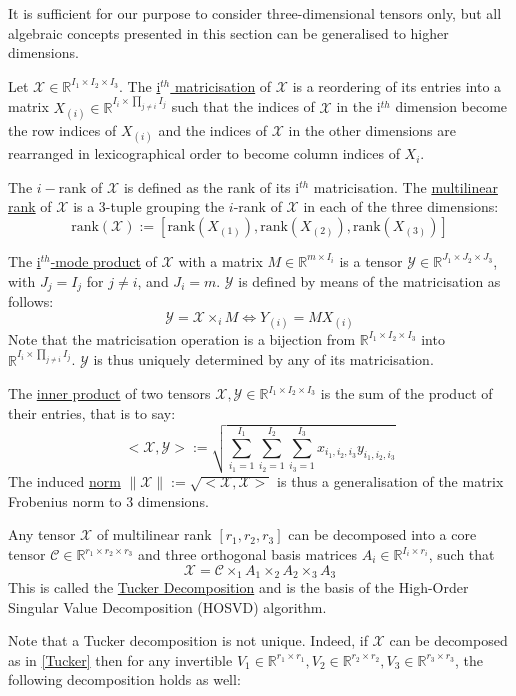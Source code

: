 \documentclass[a4paper, 11pt]{article} %
\def \be {\begin{equation*}}
\def \ee {\end{equation*}}
\def \bee {\begin{equation}}
\def \eee {\end{equation}}
\def \X {\mathcal{X}}
\def \R {\mathbb{R}}
\def \t {\times}
\def \rank{\mbox{rank}}
\def \Y {\mathcal{Y}}
\def \C {\mathcal{C}}
\begin{document}
It is sufficient for our purpose to consider three-dimensional tensors only, but all algebraic concepts presented in this section can be generalised to higher dimensions.

Let $\X \in \R^{I_1\t I_2 \t I_3}$.
The \underline{i$^{th}$ matricisation} of $\X$ is a reordering of its entries into a matrix $X_{(i)} \in \R^{ I_i\t \prod_{j\neq i}I_j}$ such that the indices of $\X$ in the i$^{th}$ dimension become the row indices of $X_{(i)}$ and the indices of $\X$ in the other dimensions are rearranged in lexicographical order to become column indices of $X_{i}$. 

The $i-$rank of $\X$ is defined as the rank of its i$^{th}$ matricisation. The \underline{multilinear rank} of $\X$ is a 3-tuple grouping the $i$-rank of $\X$ in each of the three dimensions:
\be
\rank(\X):=\left[\rank(X_{(1)}),  \rank(X_{(2)}), \rank(X_{(3)})\right]
\ee

The \underline{i$^{th}$-mode product} of $\X$ with a matrix $M \in \R^{m\t I_i}$ is a tensor $\mathcal{Y} \in \R^{J_1\t J_2\t J_3}$, with $J_j=I_j$ for $j\neq i$, and $J_i=m$. $\mathcal{Y}$ is defined by means of the matricisation as follows:
\be
\mathcal{Y}=\X \t_{i} M \iff Y_{(i)}=MX_{(i)}
\ee
Note that the matricisation operation is a bijection from $ \R^{I_1\t I_2 \t I_3}$ into $\R^{ I_i\t \prod_{j\neq i}I_j}$. $\mathcal{Y}$ is thus uniquely determined by any of its matricisation.

The \underline{inner product} of two tensors $\X, \Y \in \R^{I_1\t I_2 \t I_3}$ is the sum of the product of their entries, that is to say:
\bee
<\X,\Y>:=\sqrt{\sum\limits_{i_1=1}^{I_1}\sum\limits_{i_2=1}^{I_2}\sum\limits_{i_3=1}^{I_3} x_{i_1,i_2,i_3}y_{i_1,i_2,i_3}}
\label{innerProd}
\eee
The induced \underline{norm} $\|\X\|:=\sqrt{<\X, \X>}$ is thus a generalisation of the matrix Frobenius norm to 3 dimensions.

Any tensor $\X$ of multilinear rank $[r_1, r_2, r_3]$ can be decomposed into a core tensor $\C \in \R^{r_1\t r_2 \t r_3}$ and three orthogonal basis matrices $A_i \in \R^{I_i\t r_i}$, such that
\bee
\X=\C \t_1 A_1 \t_2 A_2 \t_3 A_3 
\label{Tucker}
\eee
This is called the \underline{Tucker Decomposition} and is the basis of the {High-Order Singular Value Decomposition} (HOSVD) algorithm. 

Note that a Tucker decomposition is not unique. Indeed, if $\X$ can be decomposed as in \autoref{Tucker} then for any invertible $V_1\in \R^{r_1\times r_1}, V_2\in \R^{r_2\times r_2}, V_3\in \R^{r_3\times r_3}$, the following decomposition holds as well:
\end{document}
